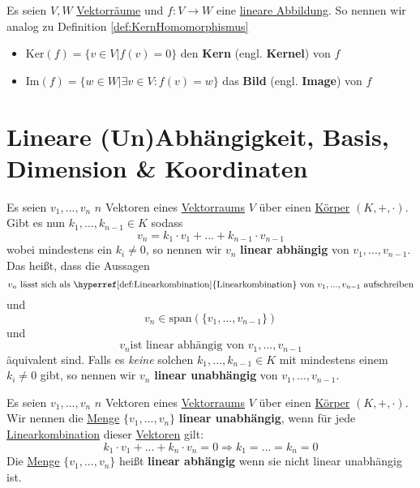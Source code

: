\documentclass[../../main.tex]{subfiles}
\begin{document}
	\begin{definition}
		\label{def:KernelLineareAbbildung}
		\label{def:KernLineareAbbildung}
		\label{def:ImageLineareAbbildung}
		\label{def:BildLineareAbbildung}
		Es seien $V, W$ \hyperref[def:Vektorraum]{Vektorräume} und $f: V \rightarrow W$ eine \hyperref[def:LineareAbbildung]{lineare Abbildung}. So nennen wir analog zu Definition \ref{def:KernHomomorphismus}
		\begin{itemize}
			\item $\textrm{Ker}(f) = \{ v \in V | f(v) = 0 \}$ den \textbf{Kern} (engl. \textbf{Kernel}) von $f$
			\item $\textrm{Im}(f) = \{ w \in W | \exists v \in V: f(v)=w \}$ das \textbf{Bild} (engl. \textbf{Image}) von $f$
		\end{itemize}
	\end{definition}

	\section{Lineare (Un)Abhängigkeit, Basis, Dimension \& Koordinaten}

	\begin{definition}
		\label{def:LineareAbhängigkeit}
		\label{def:LineareUnabhängigkeit}
		Es seien $v_1,...,v_n$ $n$ Vektoren eines \hyperref[def:Vektorraum]{Vektorraums} $V$ über einen \hyperref[def:Körper]{Körper} $(K,+,\cdot)$. Gibt es nun $k_1,...,k_{n-1} \in K$ sodass $$v_n = k_1 \cdot v_1 + ... + k_{n-1} \cdot v_{n-1}$$ wobei mindestens ein $k_i \not = 0$, so nennen wir $v_n$ \textbf{linear abhängig} von $v_1,...,v_{n-1}$. Das heißt, dass die Aussagen $$v_n \textrm{ lässt sich als \hyperref[def:Linearkombination]{Linearkombination} von } v_1,...,v_{n-1} \textrm{ aufschreiben}$$ und $$v_n \in \textrm{span}(\{v_1,...,v_{n-1}\})$$ und $$v_n \textrm{ist linear abhängig von } v_1,...,v_{n-1}$$ äquivalent sind. Falls es \textit{keine} solchen $k_1,...,k_{n-1} \in K$ mit mindestens einem $k_i \not = 0$ gibt, so nennen wir $v_n$ \textbf{linear unabhängig} von $v_1,...,v_{n-1}$.
	\end{definition}

	\begin{definition}
		\label{def:LineareAbhängigkeitMenge}
		\label{def:LineareUnabhängigkeitMenge}
		Es seien $v_1,...,v_n$ $n$ Vektoren eines \hyperref[def:Vektorraum]{Vektorraums} $V$ über einen \hyperref[def:Körper]{Körper} $(K,+,\cdot)$. Wir nennen die \hyperref[def:Menge]{Menge} $\{v_1,...,v_n\}$ \textbf{linear unabhängig}, wenn für jede \hyperref[def:Linearkombination]{Linearkombination} dieser \hyperref[def:Vektor]{Vektoren} gilt: $$k_1 \cdot v_1 + ... + k_n \cdot v_n = 0 \Rightarrow k_1 = ... = k_n = 0$$ Die \hyperref[def:Menge]{Menge} $\{v_1,...,v_n\}$ heißt \textbf{linear abhängig} wenn sie nicht linear unabhängig ist. 
	\end{definition}
\end{document}
